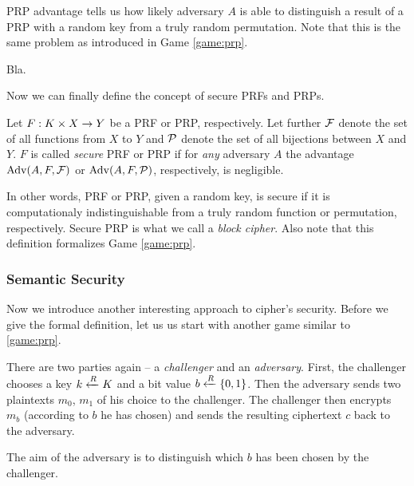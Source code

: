 PRP advantage tells us how likely adversary $A$ is able to distinguish a result of a PRP with a random key from a truly random permutation. Note that this is the same problem as introduced in Game \ref{game:prp}.   %

\begin{example}
	Bla. %
\end{example}

Now we can finally define the concept of secure PRFs and PRPs.

\begin{defn}
\label{def:secprf}\label{def:secprp}
	Let $F: K\times X\rightarrow Y$ be a PRF or PRP, respectively. Let further $\cal F$ denote the set of all functions from $X$ to $Y$ and $\cal P$ denote the set of all bijections between $X$ and $Y$. $F$ is called {\em secure} PRF or PRP if for {\em any} adversary $A$ the advantage $\operatorname*{Adv}(A,F,{\cal F})$ or $\operatorname*{Adv}(A,F,{\cal P})$, respectively, is negligible.   %
\end{defn}

In other words, PRF or PRP, given a random key, is secure if it is computationaly indistinguishable from a truly random function or permutation, respectively. Secure PRP is what we call a {\em block cipher}. Also note that this definition formalizes Game \ref{game:prp}.

\subsubsection{Semantic Security}   %

Now we introduce another interesting approach to cipher's security. Before we give the formal definition, let us us start with another game similar to \ref{game:prp}.

\begin{game}
	There are two parties again -- a {\em challenger} and an {\em adversary}. First, the challenger chooses a key $k\xleftarrow{R} K$ and a bit value $b\xleftarrow{R}\{0,1\}$. Then the adversary sends two plaintexts $m_0$, $m_1$ of his choice to the challenger. The challenger then encrypts $m_b$ (according to $b$ he has chosen) and sends the resulting ciphertext $c$ back to the adversary.
	
	The aim of the adversary is to distinguish which $b$ has been chosen by the challenger.
\end{game}

